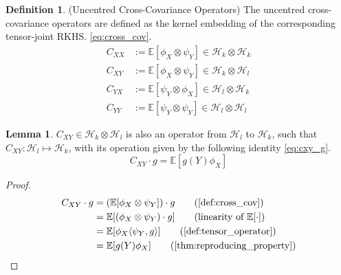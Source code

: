 \documentclass[twoside]{article} \usepackage{aistats2017}
\theoremstyle{definition}
\newtheorem{definition}[theorem]{Definition}
\newtheorem{lemma}[theorem]{Lemma}
\newcommand{\rv}[1]{{#1}}
\newcommand{\expect}[1]{{\mathbb{E}[#1]}}
\newcommand{\inner}[2]{{\langle #1, #2 \rangle}}
\newcommand{\Hk}{\mathcal{H}_{k}}
\newcommand{\Hl}{\mathcal{H}_{l}}
\newcommand{\phiX}{\phi_{\rv{X}}}
\newcommand{\psiY}{\psi_{\rv{Y}}}
\newcommand{\Cxy}{C_{\rv{X} \rv{Y}}}
\newcommand{\Cyx}{C_{\rv{Y} \rv{X}}}
\newcommand{\Cxx}{C_{\rv{X} \rv{X}}}
\newcommand{\Cyy}{C_{\rv{Y} \rv{Y}}}
\begin{document}
		\begin{definition} \label{def:cross_cov}
			(Uncentred Cross-Covariance Operators)
			The uncentred cross-covariance operators are defined as the kernel embedding of the corresponding tensor-joint RKHS. \eqref{eq:cross_cov}.
			\begin{equation}
			\begin{aligned}
				\Cxx &:= \expect{\phiX \otimes \psiY} \in \Hk \otimes \Hk \\
				\Cxy &:= \expect{\phiX \otimes \psiY} \in \Hk \otimes \Hl \\
				\Cyx &:= \expect{\psiY \otimes \phiX} \in \Hl \otimes \Hk \\
				\Cyy &:= \expect{\psiY \otimes \psiY} \in \Hl \otimes \Hl 
			\label{eq:cross_cov}
			\end{aligned}
			\end{equation}		
		\end{definition}
	
		\begin{lemma} \label{thm:cxy_g}
			$\Cxy \in \mathcal{H}_{k} \otimes \mathcal{H}_{l}$ is also an operator from $\Hl$ to $\Hk$, such that $\Cxy : \Hl \mapsto \Hk$, with its operation given by the following identity \eqref{eq:cxy_g}.
			\begin{equation}
				\Cxy \cdot g = \expect{g(\rv{Y}) \phiX}
			\label{eq:cxy_g}
			\end{equation}
		
			\begin{proof}
			\begin{align*}
				\Cxy \cdot g &=  (\expect{\phiX \otimes \psiY}) \cdot g \tag{\cref{def:cross_cov}} \\
				&= \expect{(\phiX \otimes \psiY) \cdot g} \tag{linearity of $\expect{\cdot}$} \\
				&= \expect{\phiX \inner{\psiY}{g}} \tag{\cref{def:tensor_operator}} \\
				&= \expect{g(\rv{Y}) \phiX} \tag{\cref{thm:reproducing_property}}
			\end{align*}
			\end{proof}
		\end{lemma}
			
\end{document}
